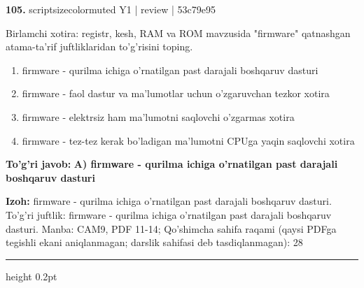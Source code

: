\documentclass[10pt,a4paper]{article}
\begin{document}
{\bfseries\sffamily\color{ink} 105.} {scriptsizecolor{muted} Y1 | review | 53c79e95}
\par
Birlamchi xotira: registr, kesh, RAM va ROM mavzusida "firmware" qatnashgan atama-ta'rif juftliklaridan to'g'risini toping.
\begin{enumerate}[label=\Alph*),leftmargin=9mm]
\item firmware - qurilma ichiga o'rnatilgan past darajali boshqaruv dasturi
\item firmware - faol dastur va ma'lumotlar uchun o'zgaruvchan tezkor xotira
\item firmware - elektrsiz ham ma'lumotni saqlovchi o'zgarmas xotira
\item firmware - tez-tez kerak bo'ladigan ma'lumotni CPUga yaqin saqlovchi xotira
\end{enumerate}
\begin{tcolorbox}[enhanced,breakable,colback=teal!4,colframe=teal!60!black,boxrule=0.45pt,arc=1.2mm,left=2.7mm,right=2.7mm,top=1.8mm,bottom=1.8mm,before skip=2mm,after skip=2mm]
{\bfseries\sffamily\color{teal}To'g'ri javob:} \textbf{A) firmware - qurilma ichiga o'rnatilgan past darajali boshqaruv dasturi}
\par\smallskip
{\bfseries Izoh:} firmware - qurilma ichiga o'rnatilgan past darajali boshqaruv dasturi. To'g'ri juftlik: firmware - qurilma ichiga o'rnatilgan past darajali boshqaruv dasturi. Manba: CAM9, PDF 11-14; Qo'shimcha sahifa raqami (qaysi PDFga tegishli ekani aniqlanmagan; darslik sahifasi deb tasdiqlanmagan): 28
\end{tcolorbox}
\vspace{2mm}\hrule height 0.2pt\vspace{3mm}
\end{document}

